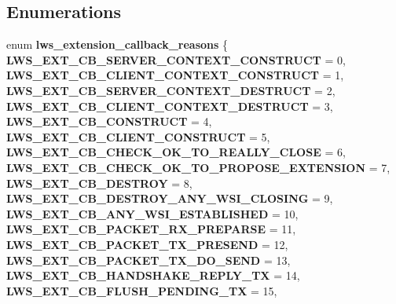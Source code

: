 \subsection*{Enumerations}
\begin{DoxyCompactItemize}
\item 
\mbox{\label{group__extensions_gae9993815eee72c6070300a0ae2f022d7}} 
enum {\bfseries lws\+\_\+extension\+\_\+callback\+\_\+reasons} \{ \newline
{\bfseries L\+W\+S\+\_\+\+E\+X\+T\+\_\+\+C\+B\+\_\+\+S\+E\+R\+V\+E\+R\+\_\+\+C\+O\+N\+T\+E\+X\+T\+\_\+\+C\+O\+N\+S\+T\+R\+U\+CT} = 0, 
{\bfseries L\+W\+S\+\_\+\+E\+X\+T\+\_\+\+C\+B\+\_\+\+C\+L\+I\+E\+N\+T\+\_\+\+C\+O\+N\+T\+E\+X\+T\+\_\+\+C\+O\+N\+S\+T\+R\+U\+CT} = 1, 
{\bfseries L\+W\+S\+\_\+\+E\+X\+T\+\_\+\+C\+B\+\_\+\+S\+E\+R\+V\+E\+R\+\_\+\+C\+O\+N\+T\+E\+X\+T\+\_\+\+D\+E\+S\+T\+R\+U\+CT} = 2, 
{\bfseries L\+W\+S\+\_\+\+E\+X\+T\+\_\+\+C\+B\+\_\+\+C\+L\+I\+E\+N\+T\+\_\+\+C\+O\+N\+T\+E\+X\+T\+\_\+\+D\+E\+S\+T\+R\+U\+CT} = 3, 
\newline
{\bfseries L\+W\+S\+\_\+\+E\+X\+T\+\_\+\+C\+B\+\_\+\+C\+O\+N\+S\+T\+R\+U\+CT} = 4, 
{\bfseries L\+W\+S\+\_\+\+E\+X\+T\+\_\+\+C\+B\+\_\+\+C\+L\+I\+E\+N\+T\+\_\+\+C\+O\+N\+S\+T\+R\+U\+CT} = 5, 
{\bfseries L\+W\+S\+\_\+\+E\+X\+T\+\_\+\+C\+B\+\_\+\+C\+H\+E\+C\+K\+\_\+\+O\+K\+\_\+\+T\+O\+\_\+\+R\+E\+A\+L\+L\+Y\+\_\+\+C\+L\+O\+SE} = 6, 
{\bfseries L\+W\+S\+\_\+\+E\+X\+T\+\_\+\+C\+B\+\_\+\+C\+H\+E\+C\+K\+\_\+\+O\+K\+\_\+\+T\+O\+\_\+\+P\+R\+O\+P\+O\+S\+E\+\_\+\+E\+X\+T\+E\+N\+S\+I\+ON} = 7, 
\newline
{\bfseries L\+W\+S\+\_\+\+E\+X\+T\+\_\+\+C\+B\+\_\+\+D\+E\+S\+T\+R\+OY} = 8, 
{\bfseries L\+W\+S\+\_\+\+E\+X\+T\+\_\+\+C\+B\+\_\+\+D\+E\+S\+T\+R\+O\+Y\+\_\+\+A\+N\+Y\+\_\+\+W\+S\+I\+\_\+\+C\+L\+O\+S\+I\+NG} = 9, 
{\bfseries L\+W\+S\+\_\+\+E\+X\+T\+\_\+\+C\+B\+\_\+\+A\+N\+Y\+\_\+\+W\+S\+I\+\_\+\+E\+S\+T\+A\+B\+L\+I\+S\+H\+ED} = 10, 
{\bfseries L\+W\+S\+\_\+\+E\+X\+T\+\_\+\+C\+B\+\_\+\+P\+A\+C\+K\+E\+T\+\_\+\+R\+X\+\_\+\+P\+R\+E\+P\+A\+R\+SE} = 11, 
\newline
{\bfseries L\+W\+S\+\_\+\+E\+X\+T\+\_\+\+C\+B\+\_\+\+P\+A\+C\+K\+E\+T\+\_\+\+T\+X\+\_\+\+P\+R\+E\+S\+E\+ND} = 12, 
{\bfseries L\+W\+S\+\_\+\+E\+X\+T\+\_\+\+C\+B\+\_\+\+P\+A\+C\+K\+E\+T\+\_\+\+T\+X\+\_\+\+D\+O\+\_\+\+S\+E\+ND} = 13, 
{\bfseries L\+W\+S\+\_\+\+E\+X\+T\+\_\+\+C\+B\+\_\+\+H\+A\+N\+D\+S\+H\+A\+K\+E\+\_\+\+R\+E\+P\+L\+Y\+\_\+\+TX} = 14, 
{\bfseries L\+W\+S\+\_\+\+E\+X\+T\+\_\+\+C\+B\+\_\+\+F\+L\+U\+S\+H\+\_\+\+P\+E\+N\+D\+I\+N\+G\+\_\+\+TX} = 15, 

\end{DoxyCompactItemize}
